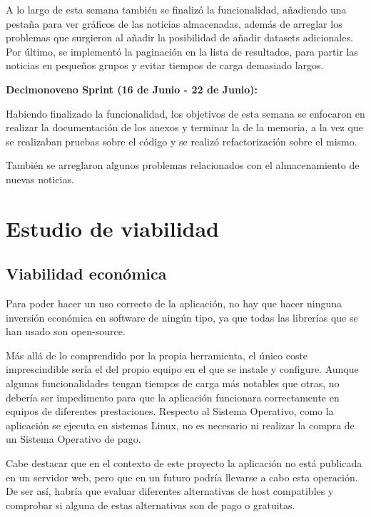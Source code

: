 A lo largo de esta semana también se finalizó la funcionalidad, añadiendo una pestaña para ver gráficos de las noticias almacenadas, además de arreglar los problemas que surgieron al añadir la posibilidad de añadir datasets adicionales. Por último, se implementó la paginación en la lista de resultados, para partir las noticias en pequeños grupos y evitar tiempos de carga demasiado largos.



\textbf{Decimonoveno Sprint (16 de Junio - 22 de Junio):}

Habiendo finalizado la funcionalidad, los objetivos de esta semana se enfocaron en realizar la documentación de los anexos y terminar la de la memoria, a la vez que se realizaban pruebas sobre el código y se realizó refactorización sobre el mismo.

También se arreglaron algunos problemas relacionados con el almacenamiento de nuevas noticias.



\section{Estudio de viabilidad}

\subsection{Viabilidad económica}

Para poder hacer un uso correcto de la aplicación, no hay que hacer ninguna inversión económica en software de ningún tipo, ya que todas las librerías que se han usado son open-source.

Más allá de lo comprendido por la propia herramienta, el único coste imprescindible sería el del propio equipo en el que se instale y configure. Aunque algunas funcionalidades tengan tiempos de carga más notables que otras, no debería ser impedimento para que la aplicación funcionara correctamente en equipos de diferentes prestaciones. Respecto al Sistema Operativo, como la aplicación se ejecuta en sistemas Linux, no es necesario ni realizar la compra de un Sistema Operativo de pago.

Cabe destacar que en el contexto de este proyecto la aplicación no está publicada en un servidor web, pero que en un futuro podría llevarse a cabo esta operación. De ser así, habría que evaluar diferentes alternativas de host compatibles y comprobar si alguna de estas alternativas son de pago o gratuitas.

